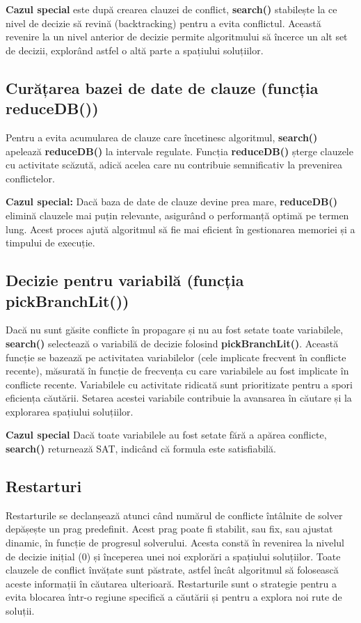 \documentclass[runningheads]{llncs}
\begin{document}
\textbf{Cazul special} este după crearea clauzei de conflict, \textbf{search()} stabilește la ce nivel de decizie să revină (backtracking) pentru a evita conflictul. Această revenire la un nivel anterior de decizie permite algoritmului să încerce un alt set de decizii, explorând astfel o altă parte a spațiului soluțiilor.

\subsection{Curățarea bazei de date de clauze (funcția reduceDB())} Pentru a evita acumularea de clauze care încetinesc algoritmul, \textbf{search()} apelează \textbf{reduceDB()} la intervale regulate. Funcția \textbf{reduceDB()} șterge clauzele cu activitate scăzută, adică acelea care nu contribuie semnificativ la prevenirea conflictelor.

\textbf{Cazul special:} Dacă baza de date de clauze devine prea mare, \textbf{reduceDB()} elimină clauzele mai puțin relevante, asigurând o performanță optimă pe termen lung. Acest proces ajută algoritmul să fie mai eficient în gestionarea memoriei și a timpului de execuție.

\subsection{Decizie pentru variabilă (funcția pickBranchLit())} Dacă nu sunt găsite conflicte în propagare și nu au fost setate toate variabilele, \textbf{search()} selectează o variabilă de decizie folosind \textbf{pickBranchLit()}. Această funcție se bazează pe activitatea variabilelor (cele implicate frecvent în conflicte recente), măsurată în funcție de frecvența cu care variabilele au fost implicate în conflicte recente. Variabilele cu activitate ridicată sunt prioritizate pentru a spori eficiența căutării. Setarea acestei variabile contribuie la avansarea în căutare și la explorarea spațiului soluțiilor.

\textbf{Cazul special} Dacă toate variabilele au fost setate fără a apărea conflicte, \textbf{search()} returnează SAT, indicând că formula este satisfiabilă.

\subsection{Restarturi}
  Restarturile se declanșează atunci când numărul de conflicte întâlnite de solver depășește un prag predefinit. Acest prag poate fi stabilit, sau fix, sau ajustat dinamic, în funcție de progresul solverului. Acesta constă în revenirea la nivelul de decizie inițial (0) și începerea unei noi explorări a spațiului soluțiilor. Toate clauzele de conflict învățate sunt păstrate, astfel încât algoritmul să folosească aceste informații în căutarea ulterioară. Restarturile sunt o strategie pentru a evita blocarea într-o regiune specifică a căutării și pentru a explora noi rute de soluții.
\end{document}

